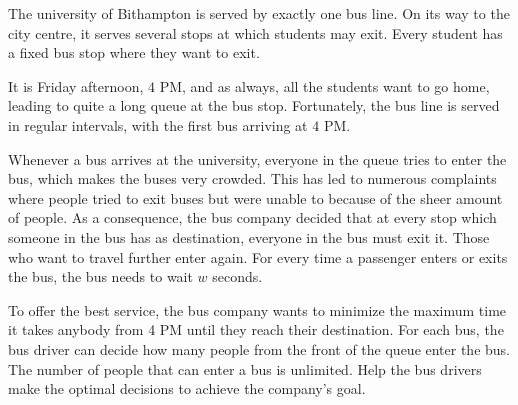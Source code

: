 

\newcommand{\maxn}{10^5}
\newcommand{\maxv}{10^6}

%
The university of Bithampton is served by exactly one bus line.
On its way to the city centre, it serves several stops at which students may exit.
Every student has a fixed bus stop where they want to exit.

It is Friday afternoon, $4$ PM, and as always, all the students want to go home, leading to quite a long queue at the bus stop.
Fortunately, the bus line is served in regular intervals, with the first bus arriving at $4$ PM.

Whenever a bus arrives at the university, everyone in the queue tries to enter the bus, which makes the buses very crowded.
This has led to numerous complaints where people tried to exit buses but were unable to because of the sheer amount of people.
As a consequence, the bus company decided that at every stop which someone in the bus has as destination, everyone in the bus must exit it.
Those who want to travel further enter again.
For every time a passenger enters or exits the bus, the bus needs to wait $w$ seconds.


To offer the best service, the bus company wants to minimize the maximum time it takes anybody from 4 PM until they reach their destination.
For each bus, the bus driver can decide how many people from the front of the queue enter the bus. The number of people that can enter a bus is unlimited.
Help the bus drivers make the optimal decisions to achieve the company's goal.

